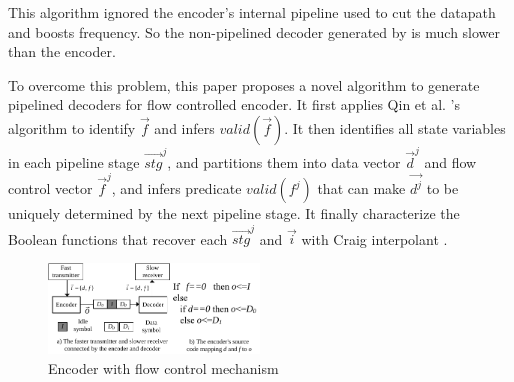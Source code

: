 \documentclass[conference]{IEEEtran}
\begin{document}
This algorithm ignored the encoder's internal pipeline
used to cut the datapath and boosts frequency.
So the non-pipelined decoder generated by \cite{QinTODAES15} is much slower than the encoder.






To overcome this problem,
this paper proposes a novel algorithm to generate pipelined decoders for flow controlled encoder.
It first applies Qin et al. \cite{QinTODAES15}'s algorithm to identify $\vec{f}$ and infers $valid(\vec{f})$.
It then identifies all state variables in each pipeline stage $\vec{stg}^j$,
and partitions them into data vector $\vec{d}^j$ and flow control vector $\vec{f}^j$,
and infers predicate $valid(f^j)$ that
can make $\vec{d^j}$ to be uniquely determined by the next pipeline stage.
It finally characterize the Boolean functions that recover each $\vec{stg}^j$ and $\vec{i}$ with 
Craig interpolant \cite{InterpBoolFunction}.

\begin{figure}[t]
\centering
\includegraphics[width=0.5\textwidth]{nonuniq}
\caption{Encoder with flow control mechanism}
\label{fig_fc}
\end{figure}

\end{document}
